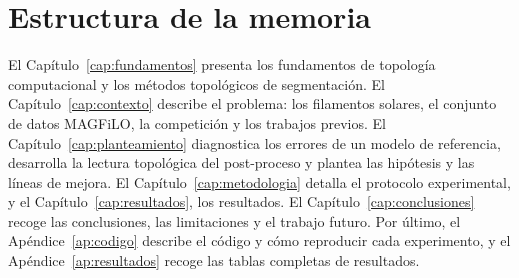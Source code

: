 \section{Estructura de la memoria}

El Capítulo~\ref{cap:fundamentos} presenta los fundamentos de topología
computacional y los métodos topológicos de segmentación. El
Capítulo~\ref{cap:contexto} describe el problema: los filamentos
solares, el conjunto de datos MAGFiLO, la competición y los trabajos
previos. El Capítulo~\ref{cap:planteamiento} diagnostica los errores de
un modelo de referencia, desarrolla la lectura topológica del
post-proceso y plantea las hipótesis y las líneas de mejora. El
Capítulo~\ref{cap:metodologia} detalla el protocolo experimental, y el
Capítulo~\ref{cap:resultados}, los resultados. El
Capítulo~\ref{cap:conclusiones} recoge las conclusiones, las
limitaciones y el trabajo futuro. Por último, el
Apéndice~\ref{ap:codigo} describe el código y cómo reproducir cada
experimento, y el Apéndice~\ref{ap:resultados} recoge las tablas
completas de resultados.
